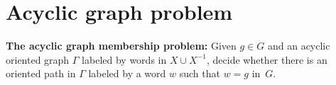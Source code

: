 \documentclass[10pt]{amsart}
\theoremstyle{definition}
\newtheorem{proposition}[theorem]{Proposition}
\def\P{{\mathbf{P}}}
\def\SSP{{\mathbf{SSP}}}
\def\BSMP{{\mathbf{BSMP}}}
\def\BKP{{\mathbf{BKP}}}
\def\KP{{\mathbf{KP}}}
\def\IKP{{\mathbf{IKP}}}
\def\SSOP{{\mathbf{SSOP}}}
\def\BSMOP{{\mathbf{BSMOP}}}
\begin{document}
%
%
%
%

\section{Acyclic graph problem}\label{sec:agp}
\medskip
\noindent
{\bf The acyclic graph membership problem:} Given $g\in G$ and an acyclic oriented graph $\Gamma$ labeled by words in $X\cup X^{-1}$, decide whether there is an oriented path in $\Gamma$ labeled by a word $w$ such that $w=g$ in~$G$.
\end{document}
